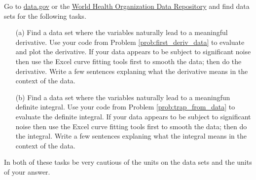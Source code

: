 \begin{problem}
    Go to \href{https://www.data.gov/}{data.gov} or the
    \href{http://apps.who.int/gho/data/?theme=home}{World Health Organization Data
    Repository} and find data sets for the following tasks.
    \begin{enumerate}
        \item[(a)] Find a data set where the variables naturally lead to a meaningful
            derivative.  Use your code from Problem  \ref{prob:first_deriv_data} to
            evaluate and plot the derivative.  If your data appears to be subject to
            significant noise then use the Excel curve fitting tools first to smooth the
            data; then do the derivative.  Write a few sentences explaning what the
            derivative means in the context of the data.
        \item[(b)] Find a data set where the variables naturally lead to a meaningfun
            definite integral.  Use your code from Problem \ref{prob:trap_from_data} to
            evaluate the definite integral.  If your data appears to be subject to
            significant noise then use the Excel curve fitting tools first to smooth the
            data; then do the integral.  Write a few sentences explaning what the
            integral means in the context of the data.
    \end{enumerate}
    In both of these tasks be very cautious of the units on the data sets and the units of
    your answer. 
\end{problem}




